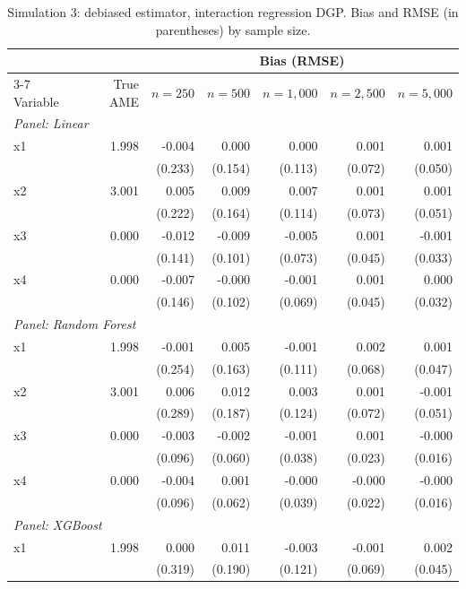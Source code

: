 \begin{table}[htbp]
\centering
\small
\begin{threeparttable}
\caption{Simulation 3: debiased estimator, interaction regression DGP. Bias and RMSE (in parentheses) by sample size.}
\label{tab:sim3_bias_regression_interaction}
\begin{tabular}{lrrrrrr}
\toprule
 & & \multicolumn{5}{c}{Bias (RMSE)} \\
\cmidrule(lr){3-7}
Variable & True AME & $n=250$ & $n=500$ & $n=1,000$ & $n=2,500$ & $n=5,000$ \\
\midrule
\multicolumn{7}{l}{\textit{Panel: Linear}} \\
\quad x1 & 1.998 & -0.004 & 0.000 & 0.000 & 0.001 & 0.001 \\
 &  & (0.233) & (0.154) & (0.113) & (0.072) & (0.050) \\
\quad x2 & 3.001 & 0.005 & 0.009 & 0.007 & 0.001 & 0.001 \\
 &  & (0.222) & (0.164) & (0.114) & (0.073) & (0.051) \\
\quad x3 & 0.000 & -0.012 & -0.009 & -0.005 & 0.001 & -0.001 \\
 &  & (0.141) & (0.101) & (0.073) & (0.045) & (0.033) \\
\quad x4 & 0.000 & -0.007 & -0.000 & -0.001 & 0.001 & 0.000 \\
 &  & (0.146) & (0.102) & (0.069) & (0.045) & (0.032) \\
\midrule
\multicolumn{7}{l}{\textit{Panel: Random Forest}} \\
\quad x1 & 1.998 & -0.001 & 0.005 & -0.001 & 0.002 & 0.001 \\
 &  & (0.254) & (0.163) & (0.111) & (0.068) & (0.047) \\
\quad x2 & 3.001 & 0.006 & 0.012 & 0.003 & 0.001 & -0.001 \\
 &  & (0.289) & (0.187) & (0.124) & (0.072) & (0.051) \\
\quad x3 & 0.000 & -0.003 & -0.002 & -0.001 & 0.001 & -0.000 \\
 &  & (0.096) & (0.060) & (0.038) & (0.023) & (0.016) \\
\quad x4 & 0.000 & -0.004 & 0.001 & -0.000 & -0.000 & -0.000 \\
 &  & (0.096) & (0.062) & (0.039) & (0.022) & (0.016) \\
\midrule
\multicolumn{7}{l}{\textit{Panel: XGBoost}} \\
\quad x1 & 1.998 & 0.000 & 0.011 & -0.003 & -0.001 & 0.002 \\
 &  & (0.319) & (0.190) & (0.121) & (0.069) & (0.045) \\

\end{tabular}
\end{threeparttable}
\end{table}
